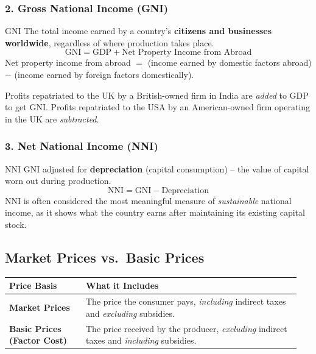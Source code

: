\documentclass[11pt, a4paper, twoside]{book}
\begin{document}
\subsubsection{2. Gross National Income (GNI)}

\begin{keyterm}{GNI}
The total income earned by a country's \textbf{citizens and businesses worldwide}, regardless of where production takes place.
\[
\text{GNI} = \text{GDP} + \text{Net Property Income from Abroad}
\]
Net property income from abroad $=$ (income earned by domestic factors abroad) $-$ (income earned by foreign factors domestically).
\end{keyterm}

\begin{example}
Profits repatriated to the UK by a British-owned firm in India are \emph{added} to GDP to get GNI. Profits repatriated to the USA by an American-owned firm operating in the UK are \emph{subtracted}.
\end{example}

\subsubsection{3. Net National Income (NNI)}

\begin{keyterm}{NNI}
GNI adjusted for \textbf{depreciation} (capital consumption) -- the value of capital worn out during production.
\[
\text{NNI} = \text{GNI} - \text{Depreciation}
\]
NNI is often considered the most meaningful measure of \emph{sustainable} national income, as it shows what the country earns after maintaining its existing capital stock.
\end{keyterm}

\subsection{Market Prices vs.\ Basic Prices}

\begin{tcolorbox}[enhanced,colback=LightBlue,colframe=MidBlue!70,arc=0pt,boxrule=0.8pt]
\begin{tabular}{@{}>{\RaggedRight\arraybackslash}p{0.25\linewidth}>{\RaggedRight\arraybackslash}p{0.70\linewidth}@{}}
\textbf{\color{NavyPrimary}Price Basis} & \textbf{\color{NavyPrimary}What it Includes} \\
\midrule
\textbf{Market Prices} & The price the consumer pays, \emph{including} indirect taxes and \emph{excluding} subsidies. \\
\textbf{Basic Prices (Factor Cost)} & The price received by the producer, \emph{excluding} indirect taxes and \emph{including} subsidies. \\
\end{tabular}
\end{tcolorbox}
\end{document}
